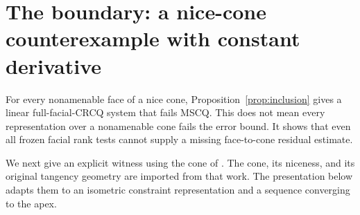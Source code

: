 \documentclass[11pt]{article}
\numberwithin{equation}{section}
\theoremstyle{definition}
\theoremstyle{remark}
\begin{document}
\section{The boundary: a nice-cone counterexample with constant derivative}
\label{sec:boundary}

For every nonamenable face of a nice cone,
Proposition~\ref{prop:inclusion} gives a linear full-facial-CRCQ system
that fails MSCQ. This does not mean every representation over a
nonamenable cone fails the error bound. It shows that even all frozen
facial rank tests cannot supply a missing face-to-cone residual estimate.

We next give an explicit witness using the cone of
\citet[Section~5]{lrs2022}. The cone, its niceness, and its original
tangency geometry are imported from that work. The presentation below
adapts them to an isometric constraint representation and a sequence
converging to the apex.
\end{document}

